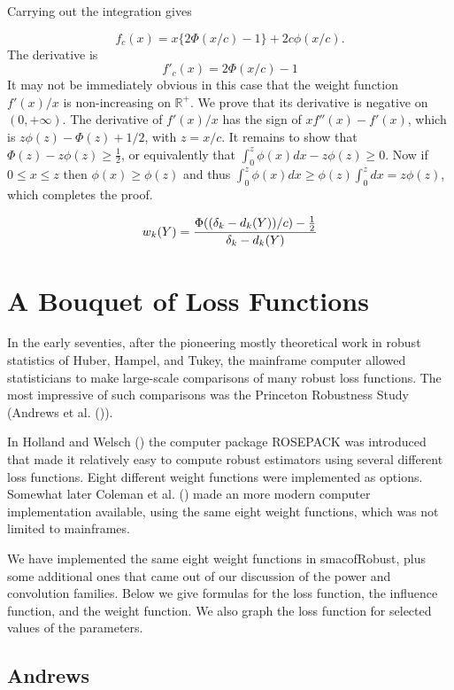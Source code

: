\documentclass[
  12pt,
  letterpaper,
  DIV=11,
  numbers=noendperiod]{scrartcl}
\newcommand{\sectionbreak}{\pagebreak}
\theoremstyle{plain}
\theoremstyle{remark}
\begin{document}
Carrying out the integration gives

\[
f_c(x)=x\{2\Phi(x/c)-1\}+2c\phi(x/c).
\] The derivative is \[
f'_c(x)=2\Phi(x/c)-1
\] It may not be immediately obvious in this case that the weight
function \(f'(x)/x\) is non-increasing on \(\mathbb{R}^+\). We prove
that its derivative is negative on \((0,+\infty)\). The derivative of
\(f'(x)/x\) has the sign of \(xf''(x)-f'(x)\), which is
\(z\phi(z)-\Phi(z)+1/2\), with \(z=x/c\). It remains to show that
\(\Phi(z)-z\phi(z)\geq\frac12\), or equivalently that
\(\int_0^z\phi(x)dx-z\phi(z)\geq 0\). Now if \(0\leq x\leq z\) then
\(\phi(x)\geq\phi(z)\) and thus
\(\int_0^z\phi(x)dx\geq\phi(z)\int_0^zdx=z\phi(z)\), which completes the
proof.

\[
w_k(Y)=
\frac{\Phi((\delta_k-d_k(Y))/c)-\frac12}{\delta_k-d_k(Y)}\\
\]

\sectionbreak

\section{A Bouquet of Loss Functions}\label{a-bouquet-of-loss-functions}

In the early seventies, after the pioneering mostly theoretical work in
robust statistics of Huber, Hampel, and Tukey, the mainframe computer
allowed statisticians to make large-scale comparisons of many robust
loss functions. The most impressive of such comparisons was the
Princeton Robustness Study (Andrews et al.
()).

In Holland and Welsch () the
computer package ROSEPACK was introduced that made it relatively easy to
compute robust estimators using several different loss functions. Eight
different weight functions were implemented as options. Somewhat later
Coleman et al.
() made an
more modern computer implementation available, using the same eight
weight functions, which was not limited to mainframes.

We have implemented the same eight weight functions in smacofRobust,
plus some additional ones that came out of our discussion of the power
and convolution families. Below we give formulas for the loss function,
the influence function, and the weight function. We also graph the loss
function for selected values of the parameters.

\subsection{Andrews}\label{andrews}
\end{document}
